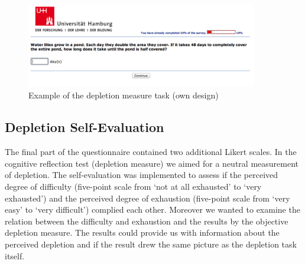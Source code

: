 \begin{figure}[h!]
\center
	\includegraphics[width=0.9\textwidth]{images/os_depletion_measure.png}
  \caption{Example of the depletion measure task (own design)}\label{fig:os_depletion_measure}
\end{figure}

\subsection{Depletion Self-Evaluation}
The final part of the questionnaire contained two additional Likert scales. In the cognitive reflection test (depletion measure) we aimed for a neutral measurement of depletion. The self-evaluation was implemented to assess if the perceived degree of difficulty (five-point scale from ‘not at all exhausted’ to ‘very exhausted’) and the perceived degree of exhaustion (five-point scale from ‘very easy’ to ‘very difficult’) complied each other. Moreover we wanted to examine the relation between the difficulty and exhaustion and the results by the objective depletion measure. The results could provide us with information about the perceived depletion and if the result drew the same picture as the depletion task itself. 

